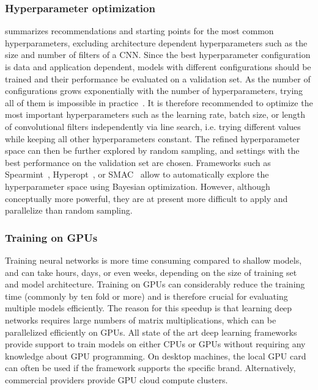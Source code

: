 \subsubsection{Hyperparameter optimization} \label{sec:dl_hyper}
 summarizes recommendations and starting points for the most common hyperparameters, excluding architecture dependent hyperparameters such as the size and number of filters of a CNN. Since the best hyperparameter configuration is data and application dependent, models with different configurations should be trained and their performance be evaluated on a validation set. As the number of configurations grows exponentially with the number of hyperparameters, trying all of them is impossible in practice~\citep{bengio_practical_2012}. It is therefore recommended to optimize the most important hyperparameters such as the learning rate, batch size, or length of convolutional filters independently via line search, i.e. trying different values while keeping all other hyperparameters constant. The refined hyperparameter space can then be further explored by random sampling, and settings with the best performance on the validation set are chosen. Frameworks such as Spearmint~\citep{snoek_practical_2012}, Hyperopt~\citep{bergstra_hyperparameter_2013}, or SMAC~\citep{hutter_sequential_2011} allow to automatically explore the hyperparameter space using Bayesian optimization. However, although conceptually more powerful, they are at present more difficult to apply and parallelize than random sampling.

\subsubsection{Training on GPUs}
Training neural networks is more time consuming compared to shallow models, and can take hours, days, or even weeks, depending on the size of training set and model architecture. Training on GPUs can considerably reduce the training time (commonly by ten fold or more) and is therefore crucial for evaluating multiple models efficiently. The reason for this speedup is that learning deep networks requires large numbers of matrix multiplications, which can be parallelized efficiently on GPUs. All state of the art deep learning frameworks provide support to train models on either CPUs or GPUs without requiring any knowledge about GPU programming. On desktop machines, the local GPU card can often be used if the framework supports the specific brand. Alternatively, commercial providers provide GPU cloud compute clusters.

